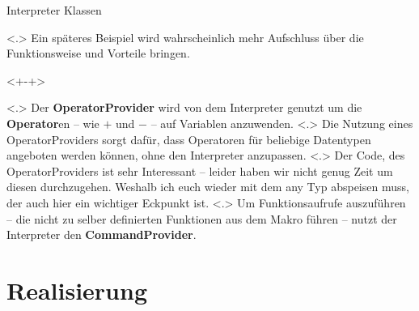 \begin{frame}{Interpreter Klassen}
\begin{uncoverenv}
          \note[item]<.>{
            Ein späteres Beispiel wird wahrscheinlich mehr Aufschluss über die Funktionsweise und Vorteile bringen.
          }
    \end{uncoverenv}
    \begin{uncoverenv}<+-+>%
          \note[item]<.>{
            Der \textbf{OperatorProvider} wird von dem Interpreter genutzt um die \textbf{Operator}en -- wie $+$ und $-$ -- auf Variablen anzuwenden.
          }
          \note[item]<.>{
            Die Nutzung eines OperatorProviders sorgt dafür, dass Operatoren für beliebige Datentypen angeboten werden können, ohne den Interpreter anzupassen.
          }
          \note[item]<.>{
            Der Code, des OperatorProviders ist sehr Interessant -- leider haben wir nicht genug Zeit um diesen durchzugehen. Weshalb ich euch wieder mit dem any Typ abspeisen muss, der auch hier ein wichtiger Eckpunkt ist.
          }
          \note[item]<.>{
            Um Funktionsaufrufe auszuführen -- die nicht zu selber definierten Funktionen aus dem Makro führen -- nutzt der Interpreter den \textbf{CommandProvider}.
          }
    \end{uncoverenv}
  \end{frame}

\section{Realisierung}

